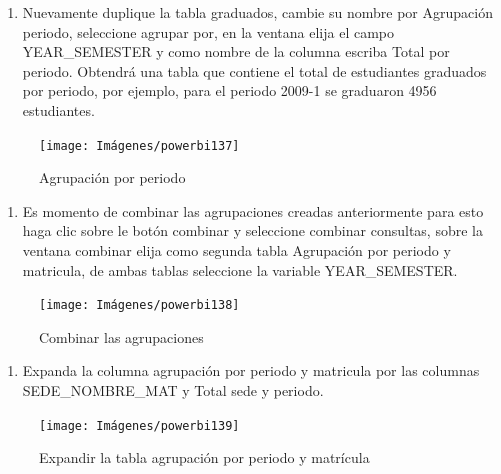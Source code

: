 \documentclass[
]{book}
\providecommand{\tightlist}{%
  \setlength{\itemsep}{0pt}\setlength{\parskip}{0pt}}
\begin{document}
\begin{enumerate}
\def\labelenumi{\arabic{enumi}.}
\setcounter{enumi}{4}
\tightlist
\item
  Nuevamente duplique la tabla graduados, cambie su nombre por Agrupación periodo, seleccione agrupar por, en la ventana elija el campo YEAR\_SEMESTER y como nombre de la columna escriba Total por periodo. Obtendrá una tabla que contiene el total de estudiantes graduados por periodo, por ejemplo, para el periodo 2009-1 se graduaron 4956 estudiantes.
\end{enumerate}

\begin{figure}

{\centering \texttt{[image: Imágenes/powerbi137]} 

}

\caption{Agrupación por periodo}\label{fig:agruparporperiodoa-fig}
\end{figure}

\begin{enumerate}
\def\labelenumi{\arabic{enumi}.}
\setcounter{enumi}{5}
\tightlist
\item
  Es momento de combinar las agrupaciones creadas anteriormente para esto haga clic sobre le botón combinar y seleccione combinar consultas, sobre la ventana combinar elija como segunda tabla Agrupación por periodo y matricula, de ambas tablas seleccione la variable YEAR\_SEMESTER.
\end{enumerate}

\begin{figure}

{\centering \texttt{[image: Imágenes/powerbi138]} 

}

\caption{Combinar las agrupaciones}\label{fig:combinaragrupaciones-fig}
\end{figure}

\begin{enumerate}
\def\labelenumi{\arabic{enumi}.}
\setcounter{enumi}{6}
\tightlist
\item
  Expanda la columna agrupación por periodo y matricula por las columnas SEDE\_NOMBRE\_MAT y Total sede y periodo.
\end{enumerate}

\begin{figure}

{\centering \texttt{[image: Imágenes/powerbi139]} 

}

\caption{Expandir la tabla agrupación por periodo y matrícula}\label{fig:expandiragrupacionperiodoymatricla-fig}
\end{figure}
\end{document}
